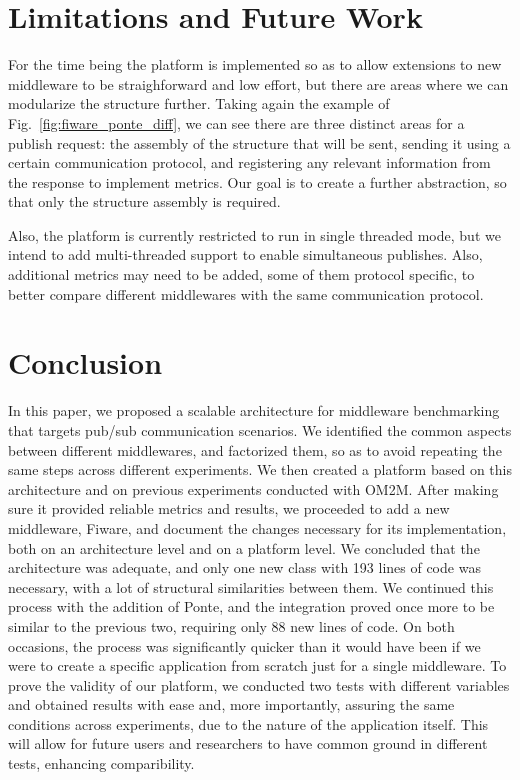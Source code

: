 \documentclass[conference]{IEEEtran}
\begin{document}
\section{Limitations and Future Work}
For the time being the platform is implemented so as to allow extensions to new middleware to be straighforward and low effort, but there are areas where we can modularize the structure further. Taking again the example of Fig.~\ref{fig:fiware_ponte_diff}, we can see there are three distinct areas for a publish request: the assembly of the structure that will be sent, sending it using a certain communication protocol, and registering any relevant information from the response to implement metrics. Our goal is to create a further abstraction, so that only the structure assembly is required. 

Also, the platform is currently restricted to run in single threaded mode, but we intend to add multi-threaded support to enable simultaneous publishes. Also, additional metrics may need to be added, some of them protocol specific, to better compare different middlewares with the same communication protocol. 

\section{Conclusion}

In this paper, we proposed a scalable architecture for middleware benchmarking that targets pub/sub communication scenarios. We identified the common aspects between different middlewares, and factorized them, so as to avoid repeating the same steps across different experiments. We then created a platform based on this architecture and on previous experiments conducted with OM2M. After making sure it provided reliable metrics and results, we proceeded to add a new middleware, Fiware, and document the changes necessary for its implementation, both on an architecture level and on a platform level. We concluded that the architecture was adequate, and only one new class with 193 lines of code was necessary, with a lot of structural similarities between them. We continued this process with the addition of Ponte, and the integration proved once more to be similar to the previous two, requiring only 88 new lines of code. On both occasions, the process was significantly quicker than it would have been if we were to create a specific application from scratch just for a single middleware. To prove the validity of our platform, we conducted two tests with different variables and obtained results with ease and, more importantly, assuring the same conditions across experiments, due to the nature of the application itself. This will allow for future users and researchers to have common ground in different tests, enhancing comparibility.
\end{document}
